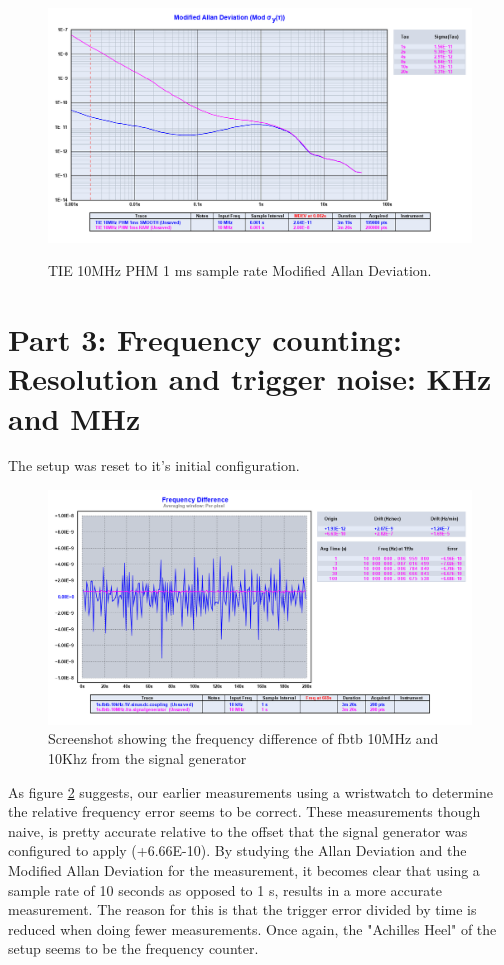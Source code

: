 \documentclass[11pt,english,a4paper]{article}
\begin{document}
\begin{figure}[!htb]
  \centering
    \includegraphics[width=1\textwidth]{tie_10mhz_phm_1ms_modified_allan.png}
    \label{fig:PHM_10MHz_mod_allan_dev}
    \caption{TIE 10MHz PHM 1 ms sample rate Modified Allan Deviation.}
\end{figure}

\newpage
\section{Part 3: Frequency counting: Resolution and trigger noise: KHz and MHz}
The setup was reset to it's initial configuration. 
\begin{figure}[!htb]
  \centering
    \includegraphics[width=1\textwidth]{freq_diff_del3.png}
   \caption{Screenshot showing the frequency difference of fbtb 10MHz and 10Khz from the signal generator}
  \label{fig:freq_diff_3}
\end{figure}
As figure \ref{fig:freq_diff_3} suggests, our earlier measurements using a wristwatch to determine the relative frequency error seems to be correct. These measurements though naive, is pretty accurate relative to the offset that the signal generator was configured to apply (+6.66E-10). By studying the Allan Deviation and the Modified Allan Deviation for the measurement, it becomes clear that using a sample rate of 10 seconds as opposed to 1 s, results in a more accurate measurement. The reason for this is that the trigger error divided by time is reduced when doing fewer measurements. Once again, the "Achilles Heel" of the setup seems to be the frequency counter. 
\end{document}
